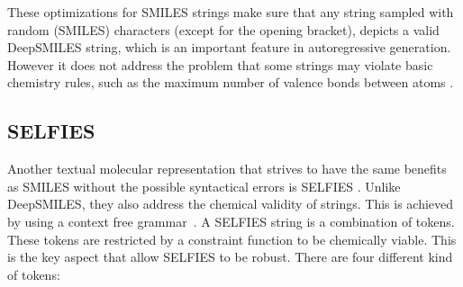 These optimizations for SMILES strings make sure that any string sampled with random (SMILES) characters (except for the opening bracket),
depicts a valid DeepSMILES string,
which is an important feature in autoregressive generation. However it does not address the problem that some strings may violate basic chemistry rules, such as the maximum number of valence bonds between atoms \cite{krenn2020self}.

\subsection{SELFIES}

Another textual molecular representation that strives to have the same benefits as SMILES without the possible syntactical errors is \ac{SELFIES} \cite{krenn2020self}.
Unlike DeepSMILES, they also address the chemical validity of strings. This is achieved by using a context free grammar~\cite{lo2023recent}. A SELFIES string is a combination of tokens. These tokens are restricted by a constraint function to be chemically viable.
This is the key aspect that allow SELFIES to be robust. There are four different kind of tokens:

